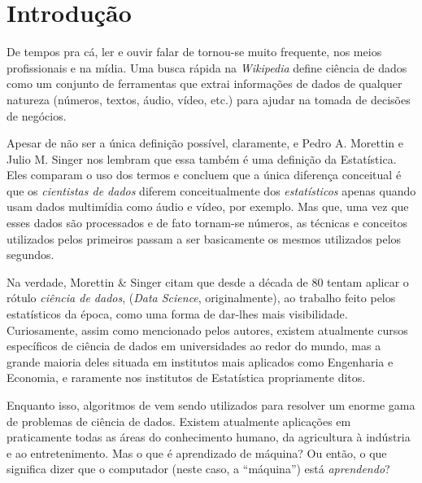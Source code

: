
\chapter{Introdução}
\label{cap:introducao}


De tempos pra cá, ler e ouvir falar de  tornou-se muito frequente, nos meios profissionais e na mídia. Uma busca rápida na \emph{Wikipedia} \citep{wiki} define ciência de dados como um conjunto de ferramentas que extrai informações de dados de qualquer natureza (números, textos, áudio, vídeo, etc.) para ajudar na tomada de decisões de negócios.

Apesar de não ser a única definição possível, claramente, e Pedro A. Morettin e Julio M. Singer \citep{apostila} nos lembram que essa também é uma definição da Estatística. Eles comparam o uso dos termos e concluem que a única diferença conceitual é que os \emph{cientistas de dados} diferem conceitualmente dos \emph{estatísticos} apenas quando usam dados multimídia como áudio e vídeo, por exemplo. Mas que, uma vez que esses dados são processados e de fato tornam-se números, as técnicas e conceitos utilizados pelos primeiros passam a ser basicamente os mesmos utilizados pelos segundos.

Na verdade, Morettin \& Singer \citep{apostila} citam que desde a década de 80 tentam aplicar o rótulo \emph{ciência de dados}, (\emph{Data Science}, originalmente), ao trabalho feito pelos estatísticos da época, como uma forma de dar-lhes mais visibilidade. Curiosamente, assim como mencionado pelos autores, existem atualmente cursos específicos de ciência de dados em universidades ao redor do mundo, mas a grande maioria deles situada em institutos mais aplicados como Engenharia e Economia, e raramente nos institutos de Estatística propriamente ditos.

Enquanto isso, algoritmos de  vem sendo utilizados para resolver um enorme gama de problemas de ciência de dados. Existem atualmente aplicações em praticamente todas as áreas do conhecimento humano, da agricultura à indústria e ao entretenimento. Mas o que é aprendizado de máquina? Ou então, o que significa dizer que o computador (neste caso, a ``máquina'') está \emph{aprendendo}?

